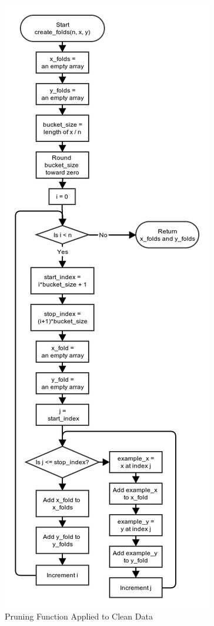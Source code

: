 \documentclass[11pt,a4paper]{article}
\begin{document}
\begin{figure}[p]
		\includegraphics[width=\textwidth, height=\textheight]{images/flow_chart/create_folds.png}
     	\caption{Pruning Function Applied to Clean Data}
     	\label{fig:pruningClean}
\end{figure}
\end{document}
